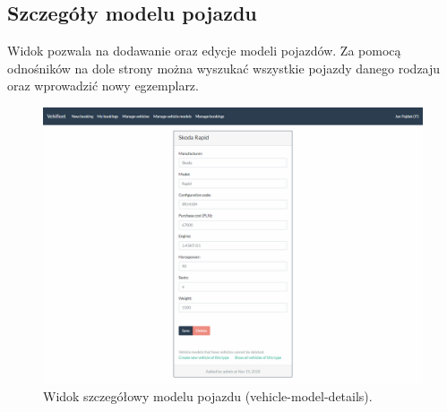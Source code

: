 \documentclass[eng,printmode,openany]{mgr}
\begin{document}
\begin{appendices}
		\newpage
		\section{Szczegóły modelu pojazdu}
		Widok pozwala na dodawanie oraz edycje modeli pojazdów. Za pomocą odnośników na dole strony można wyszukać wszystkie pojazdy danego rodzaju oraz wprowadzić nowy egzemplarz.
		\begin{figure}[H]
			\centering
			\includegraphics[width=\textwidth]{images/views/vehicle-model-detail.png}
			\caption{Widok szczegółowy modelu pojazdu (vehicle-model-details).}
		\end{figure}
	\end{appendices}
\end{document}
